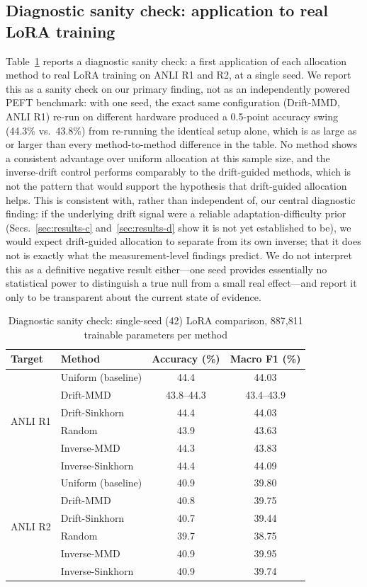 \documentclass[conference]{IEEEtran}
\begin{document}
\subsection{Diagnostic sanity check: application to real LoRA training}
Table~\ref{tab:peft} reports a diagnostic sanity check: a first application of each allocation method to real LoRA training on ANLI R1 and R2, at a single seed. We report this as a sanity check on our primary finding, not as an independently powered PEFT benchmark: with one seed, the exact same configuration (Drift-MMD, ANLI R1) re-run on different hardware produced a 0.5-point accuracy swing (44.3\% vs.\ 43.8\%) from re-running the identical setup alone, which is as large as or larger than every method-to-method difference in the table. No method shows a consistent advantage over uniform allocation at this sample size, and the inverse-drift control performs comparably to the drift-guided methods, which is not the pattern that would support the hypothesis that drift-guided allocation helps. This is consistent with, rather than independent of, our central diagnostic finding: if the underlying drift signal were a reliable adaptation-difficulty prior (Secs.~\ref{sec:results-c} and~\ref{sec:results-d} show it is not yet established to be), we would expect drift-guided allocation to separate from its own inverse; that it does not is exactly what the measurement-level findings predict. We do not interpret this as a definitive negative result either---one seed provides essentially no statistical power to distinguish a true null from a small real effect---and report it only to be transparent about the current state of evidence.

\begin{table}[htbp]
\caption{Diagnostic sanity check: single-seed (42) LoRA comparison, 887{,}811 trainable parameters per method}
\label{tab:peft}
\centering
\begin{tabular}{llcc}
\toprule
Target & Method & Accuracy (\%) & Macro F1 (\%) \\
\midrule
\multirow{6}{*}{ANLI R1}
 & Uniform (baseline) & 44.4 & 44.03 \\
 & Drift-MMD & 43.8--44.3 & 43.4--43.9 \\
 & Drift-Sinkhorn & 44.4 & 44.03 \\
 & Random & 43.9 & 43.63 \\
 & Inverse-MMD & 44.3 & 43.83 \\
 & Inverse-Sinkhorn & 44.4 & 44.09 \\
\midrule
\multirow{6}{*}{ANLI R2}
 & Uniform (baseline) & 40.9 & 39.80 \\
 & Drift-MMD & 40.8 & 39.75 \\
 & Drift-Sinkhorn & 40.7 & 39.44 \\
 & Random & 39.7 & 38.75 \\
 & Inverse-MMD & 40.9 & 39.95 \\
 & Inverse-Sinkhorn & 40.9 & 39.74 \\
\bottomrule
\end{tabular}
\end{table}
\end{document}
